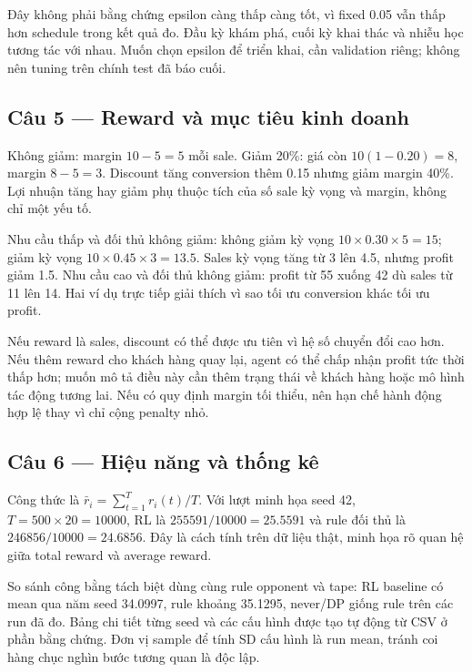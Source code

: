 Đây không phải bằng chứng epsilon càng thấp càng tốt, vì fixed 0.05 vẫn
thấp hơn schedule trong kết quả đo. Đầu kỳ khám phá, cuối kỳ khai thác
và nhiễu học tương tác với nhau. Muốn chọn epsilon để triển khai, cần
validation riêng; không nên tuning trên chính test đã báo cuối.

\subsection{Câu 5 --- Reward và mục tiêu kinh
doanh}\label{cuxe2u-5-reward-vuxe0-mux1ee5c-tiuxeau-kinh-doanh}

Không giảm: margin \(10-5=5\) mỗi sale. Giảm 20\%: giá còn
\(10(1-0.20)=8\), margin \(8-5=3\). Discount tăng conversion thêm 0.15
nhưng giảm margin 40\%. Lợi nhuận tăng hay giảm phụ thuộc tích của số
sale kỳ vọng và margin, không chỉ một yếu tố.

Nhu cầu thấp và đối thủ không giảm: không giảm kỳ vọng
\(10\times0.30\times5=15\); giảm kỳ vọng \(10\times0.45\times3=13.5\).
Sales kỳ vọng tăng từ 3 lên 4.5, nhưng profit giảm 1.5. Nhu cầu cao và
đối thủ không giảm: profit từ 55 xuống 42 dù sales từ 11 lên 14. Hai ví
dụ trực tiếp giải thích vì sao tối ưu conversion khác tối ưu profit.

Nếu reward là sales, discount có thể được ưu tiên vì hệ số chuyển đổi
cao hơn. Nếu thêm reward cho khách hàng quay lại, agent có thể chấp nhận
profit tức thời thấp hơn; muốn mô tả điều này cần thêm trạng thái về
khách hàng hoặc mô hình tác động tương lai. Nếu có quy định margin tối
thiểu, nên hạn chế hành động hợp lệ thay vì chỉ cộng penalty nhỏ.

\subsection{Câu 6 --- Hiệu năng và thống
kê}\label{cuxe2u-6-hiux1ec7u-nux103ng-vuxe0-thux1ed1ng-kuxea}

Công thức là \(\bar r_i=\sum_{t=1}^T r_i(t)/T\). Với lượt minh họa seed
42, \(T=500\times20=10000\), RL là \(255591/10000=25.5591\) và rule đối
thủ là \(246856/10000=24.6856\). Đây là cách tính trên dữ liệu thật,
minh họa rõ quan hệ giữa total reward và average reward.

So sánh công bằng tách biệt dùng cùng rule opponent và tape: RL baseline
có mean qua năm seed 34.0997, rule khoảng 35.1295, never/DP giống rule
trên các run đã đo. Bảng chi tiết từng seed và các cấu hình được tạo tự
động từ CSV ở phần bằng chứng. Đơn vị sample để tính SD cấu hình là run
mean, tránh coi hàng chục nghìn bước tương quan là độc lập.

